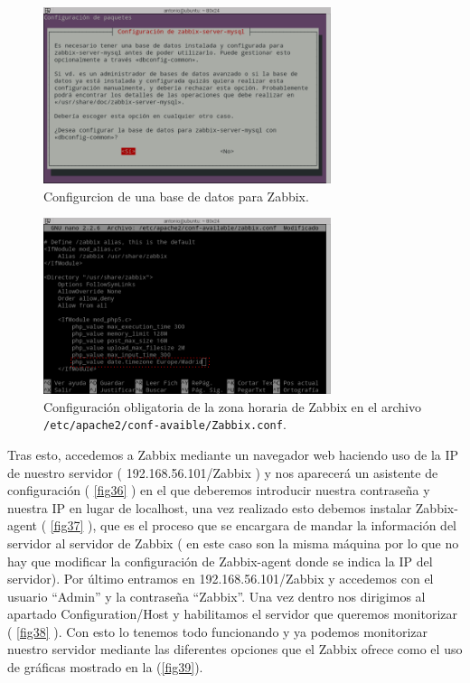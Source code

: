 \begin{figure}[H]
  \begin{center}
    \includegraphics[width=0.75\textwidth]{imagenes/zab5}
    \caption{Configurcion de una base de datos para Zabbix.}
    \label{fig34}
  \end{center}
\end{figure}

\begin{figure}[H]
  \begin{center}
    \includegraphics[width=0.75\textwidth]{imagenes/zab6}
    \caption{Configuración obligatoria de la zona horaria de Zabbix en el archivo \texttt{/etc/apache2/conf-avaible/Zabbix.conf}.}
    \label{fig35}
  \end{center}
\end{figure}

Tras esto, accedemos a Zabbix mediante un navegador web haciendo uso de la IP de nuestro servidor ( 192.168.56.101/Zabbix ) y nos aparecerá un asistente de configuración ( \cref{fig36} ) en el que deberemos introducir nuestra contraseña y nuestra IP en lugar de localhost, una vez realizado esto debemos instalar Zabbix-agent ( \cref{fig37} ), que es el proceso que se encargara de mandar la información del servidor al servidor de Zabbix ( en este caso son la misma máquina por lo que no hay que modificar la configuración de Zabbix-agent donde se indica la IP del servidor). Por último entramos en 192.168.56.101/Zabbix y accedemos con el usuario ``Admin'' y la contraseña ``Zabbix''. Una vez dentro nos dirigimos al apartado Configuration/Host y habilitamos el servidor que queremos monitorizar ( \cref{fig38} ). Con esto lo tenemos todo funcionando y ya podemos monitorizar nuestro servidor mediante las diferentes opciones que el Zabbix ofrece como el uso de gráficas mostrado en la (\cref{fig39}).   

